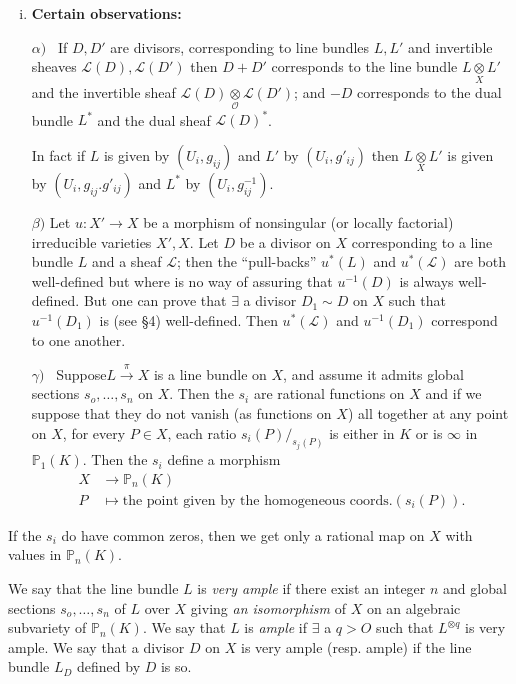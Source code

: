 {\begin{enumerate}[(i)]
\item{\bf Certain observations:}

$\alpha)$~ If $D,D'$ are divisors, corresponding to line bundles $L,L'$
  and invertible sheaves $\mathscr{L}(D), \mathscr{L}(D')$ then $D +
  D'$ corresponds to the line bundle $L \underset{X}\otimes L'$ and
  the invertible sheaf $\mathscr{L}(D) \underset{\mathscr{O}}\otimes
  \mathscr{L}(D')$; and $- D$ corresponds to the dual bundle $L^{*}$
  and the dual sheaf $\mathscr{L}(D)^{*}$. 


In fact if $L$ is given by $(U_{i}, g_{ij})$ and $L'$ by $(U_{i},
g'_{ij})$ then $L\underset{X}\otimes L'$  is given by $(U_{i},
g_{ij}.g'_{ij})$ and $L^{*}$ by $(U_{i}, g^{-1}_{ij})$.  

$\beta)$ Let $u : X' \to X $ be a morphism of nonsingular (or locally
factorial) irreducible varieties $X' ,X$. Let $D$ be a divisor on $X$
corresponding to a line bundle $L$ and a sheaf $\mathscr{L}$; then the
``pull-backs'' $u^{*}(L)$ and $u^{*}(\mathscr{L})$ are both well-defined
but where is no way of assuring that $u^{-1}(D)$ is always
well-defined. But one can prove that $\exists$  a divisor $D_{1}\sim
D$ on $X$ such that $u^{-1}(D_{1})$ is (see \S 4) well-defined. Then $u^*
(\mathscr{L})$ and $u^{-1} (D_1)$ correspond to one another. 

$\gamma)$~ Suppose\pageoriginale $L \xrightarrow{\pi} X$ is a line bundle on $X$, and
assume it admits global sections $s_{o},\ldots,s_{n}$ on $X$. Then the
$s_{i}$ are rational functions on $X$ and if we suppose that they do
not vanish (as functions on $X$) all together at any point on $X$, for
every $P \in X$, each ratio $s_{i}(P)/_{s_{j}(P)}$ is either in $K$ or
is $\infty$ in $\mathbb{P}_{1}(K)$. Then the $s_{i}$ define a morphism  
\begin{align*}
  X & \to \mathbb{P}_{n}(K)\\
  P & \mapsto \text{the point given by the homogeneous coords}. (s_{i}(P)).
\end{align*} 
\end{enumerate}

If the $s_{i}$ do have common zeros, then we get only a rational map on $X$
with values in $\mathbb{P}_{n}(K)$. 

\begin{defn}\label{chap1:sec2:def4}%
  We say that the line bundle $L$ is {\em very ample} if there exist
  an integer $n$ and global sections $s_{o},\ldots,s_{n}$ of $L$ over
  $X$ giving {\em an isomorphism} of $X$ on an algebraic subvariety of
  $\mathbb{P}_{n}(K)$. We say that $L$ is {\em ample} if $\exists$ a
  $q > O$ such that $L^{\otimes q}$ is very ample. We say that a
  divisor $D$ on $X$ is very ample (resp. ample) if the line bundle
  $L_{D}$ defined by $D$ is so. 
\end{defn}  

}
